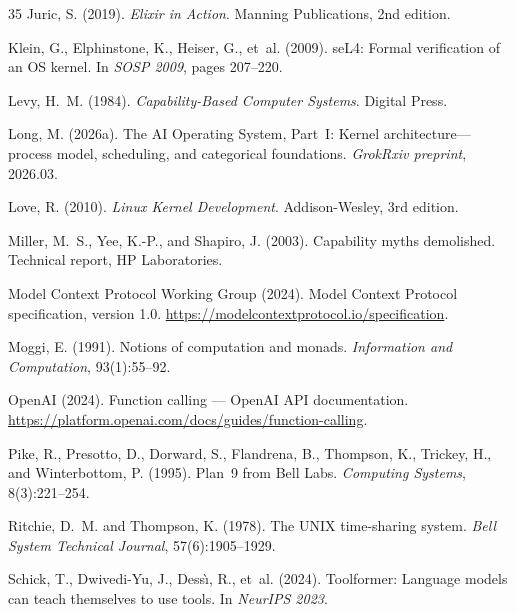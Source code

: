 \documentclass[12pt,a4paper]{article}
\theoremstyle{plain}
\theoremstyle{definition}
\begin{document}
\begin{thebibliography}{35}
Juric, S. (2019).
\newblock \emph{Elixir in Action}.
\newblock Manning Publications, 2nd edition.

Klein, G., Elphinstone, K., Heiser, G., et~al. (2009).
\newblock seL4: Formal verification of an OS kernel.
\newblock In \emph{SOSP 2009}, pages 207--220.

Levy, H.~M. (1984).
\newblock \emph{Capability-Based Computer Systems}.
\newblock Digital Press.

Long, M. (2026a).
\newblock The AI Operating System, Part~I: Kernel architecture---process model, scheduling, and categorical foundations.
\newblock \emph{GrokRxiv preprint}, 2026.03.

Love, R. (2010).
\newblock \emph{Linux Kernel Development}.
\newblock Addison-Wesley, 3rd edition.

Miller, M.~S., Yee, K.-P., and Shapiro, J. (2003).
\newblock Capability myths demolished.
\newblock Technical report, HP Laboratories.

Model Context Protocol Working Group (2024).
\newblock Model Context Protocol specification, version 1.0.
\newblock \url{https://modelcontextprotocol.io/specification}.

Moggi, E. (1991).
\newblock Notions of computation and monads.
\newblock \emph{Information and Computation}, 93(1):55--92.

OpenAI (2024).
\newblock Function calling --- OpenAI API documentation.
\newblock \url{https://platform.openai.com/docs/guides/function-calling}.

Pike, R., Presotto, D., Dorward, S., Flandrena, B., Thompson, K., Trickey, H., and Winterbottom, P. (1995).
\newblock Plan~9 from Bell Labs.
\newblock \emph{Computing Systems}, 8(3):221--254.

Ritchie, D.~M. and Thompson, K. (1978).
\newblock The UNIX time-sharing system.
\newblock \emph{Bell System Technical Journal}, 57(6):1905--1929.

Schick, T., Dwivedi-Yu, J., Dess\`{\i}, R., et~al. (2024).
\newblock Toolformer: Language models can teach themselves to use tools.
\newblock In \emph{NeurIPS 2023}.


\end{thebibliography}
\end{document}
